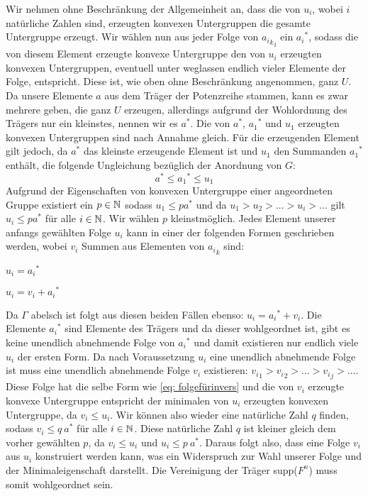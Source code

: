 {Wir nehmen ohne Beschränkung der Allgemeinheit an, dass die von $u_i$, wobei $i$ natürliche Zahlen sind, erzeugten konvexen Untergruppen die gesamte Untergruppe erzeugt. Wir wählen nun aus jeder Folge von ${{a_i}_k}_i$ ein ${a_i}^*$, sodass die von diesem Element erzeugte konvexe Untergruppe den von $u_i$ erzeugten konvexen Untergruppen, eventuell unter weglassen endlich vieler Elemente der Folge, entspricht. Diese ist, wie oben ohne Beschränkung angenommen, ganz $U$. Da unsere Elemente $a$ aus dem Träger der Potenzreihe stammen, kann es zwar mehrere geben, die ganz $U$ erzeugen, allerdings aufgrund der Wohlordnung des Trägers nur ein kleinstes, nennen wir es $a^*$. Die von $a^*$, ${a_1}^*$ und $u_1$ erzeugten konvexen Untergruppen sind nach Annahme gleich. Für die erzeugenden Element gilt jedoch, da $a^*$ das kleinste erzeugende Element ist und $u_1$ den Summanden ${a_1}^*$ enthält, die folgende Ungleichung bezüglich der Anordnung von $G$: 
\[a^* \le {a_1}^* \le u_1\]
Aufgrund der Eigenschaften von konvexen Untergruppe einer angeordneten Gruppe existiert ein $p \in \mathbb{N}$ sodass $u_1 \le pa^*$ und da $u_1 > u_2 > ... > u_i > ...$ gilt $u_i \le pa^*$ für alle $i \in \mathbb{N}$. Wir wählen $p$ kleinstmöglich.
Jedes Element unserer anfangs gewählten Folge $u_i$ kann in einer der folgenden Formen geschrieben werden, wobei $v_i$ Summen aus Elementen von ${a_i}_k$ sind:
\begin{multicols}{2}
\item $u_i = {a_i}^*$
\item $u_i = v_i+{a_i}^*$
\end{multicols}
Da $\Gamma$ abelsch ist folgt aus diesen beiden Fällen ebenso: $u_i = {a_i}^* + v_i$. Die Elemente ${a_i}^*$ sind Elemente des Trägers und da dieser wohlgeordnet ist, gibt es keine unendlich abnehmende Folge von ${a_i}^*$ und damit existieren nur endlich viele $u_i$ der ersten Form. Da nach Voraussetzung $u_i$ eine unendlich abnehmende Folge ist muss eine unendlich abnehmende Folge $v_i$ existieren: ${v_i}_1 > {v_i}_2 > ... > {v_i}_j > ...$. Diese Folge hat die selbe Form wie \ref{eq: folgefürinvers} und die von $v_i$ erzeugte konvexe Untergruppe entspricht der minimalen von $u_i$ erzeugten konvexen Untergruppe, da $v_i \le u_i$. Wir können also wieder eine natürliche Zahl $q$ finden, sodass $v_i \le q~a^*$ für alle $i \in \mathbb{N}$. Diese natürliche Zahl $q$ ist kleiner gleich dem vorher gewählten $p$, da $v_i \le u_i$ und $u_i \le p~a^*$. Daraus folgt also, dass eine Folge $v_i$ aus $u_i$ konstruiert werden kann, was ein Widerspruch zur Wahl unserer Folge und der Minimaleigenschaft darstellt. Die Vereinigung der Träger supp($F^n$) muss somit wohlgeordnet sein. \\
}
